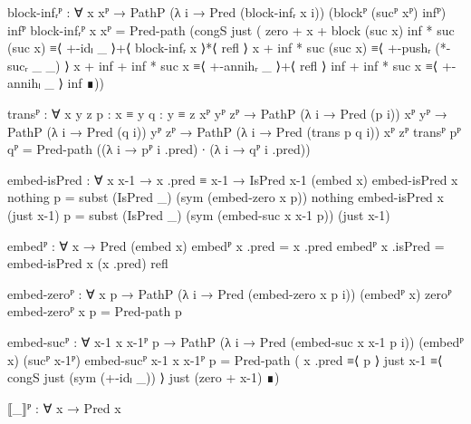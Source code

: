 \begin{code}[hide]
  block-infᵣᴾ :
    ∀ {x} xᴾ → PathP (λ i → Pred (block-infᵣ x i)) (blockᴾ (sucᴾ xᴾ) infᴾ) infᴾ
  block-infᵣᴾ {x} xᴾ =
    Pred-path
      (congS just
        ( zero + x + block (suc x) inf * suc (suc x) ≡⟨ +-idₗ _ ⟩+⟨ block-infᵣ x ⟩*⟨ refl ⟩
          x + inf * suc (suc x)                      ≡⟨ +-pushᵣ (*-sucᵣ _ _) ⟩
          x + inf + inf * suc x                      ≡⟨ +-annihᵣ _ ⟩+⟨ refl ⟩
          inf + inf * suc x                          ≡⟨ +-annihₗ _ ⟩
          inf                                        ∎))

  transᴾ :
    ∀ {x y z} {p : x ≡ y} {q : y ≡ z} {xᴾ yᴾ zᴾ} →
    PathP (λ i → Pred (p i)) xᴾ yᴾ → PathP (λ i → Pred (q i)) yᴾ zᴾ →
    PathP (λ i → Pred (trans p q i)) xᴾ zᴾ
  transᴾ pᴾ qᴾ = Pred-path ((λ i → pᴾ i .pred) ∙ (λ i → qᴾ i .pred))

  embed-isPred : ∀ x x-1 → x .pred ≡ x-1 → IsPred x-1 (embed x)
  embed-isPred x nothing p = subst (IsPred _) (sym (embed-zero x p)) nothing
  embed-isPred x (just x-1) p =
    subst (IsPred _) (sym (embed-suc x x-1 p)) (just x-1)

  embedᴾ : ∀ x → Pred (embed x)
  embedᴾ x .pred = x .pred
  embedᴾ x .isPred = embed-isPred x (x .pred) refl

  embed-zeroᴾ : ∀ x p → PathP (λ i → Pred (embed-zero x p i)) (embedᴾ x) zeroᴾ
  embed-zeroᴾ x p = Pred-path p

  embed-sucᴾ :
    ∀ {x-1} x x-1ᴾ p →
    PathP (λ i → Pred (embed-suc x x-1 p i)) (embedᴾ x) (sucᴾ x-1ᴾ)
  embed-sucᴾ {x-1} x x-1ᴾ p = Pred-path
    ( x .pred           ≡⟨ p ⟩
      just x-1          ≡⟨ congS just (sym (+-idₗ _)) ⟩
      just (zero + x-1) ∎)
\end{code}
\begin{code}
  ⟦_⟧ᴾ : ∀ x → Pred x
\end{code}
